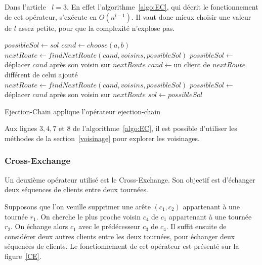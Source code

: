 \documentclass[a4paper,11pt]{article}%
\begin{document}
Dans l'article~\cite{Sorensen_2017} $l = 3$. En effet l'algorithme~\ref{algo:EC}, qui décrit le fonctionnement de cet opérateur, s'exécute en $O(n^{l-1})$. Il vaut donc mieux choisir une valeur de $l$ assez petite, pour que la complexité n'explose pas. 

\begin{algorithm}
\DontPrintSemicolon %
$possibleSol \gets sol$\;
$cand \gets choose(a,b)$\;
$nextRoute \gets findNextRoute(cand,voisins,possibleSol)$\;
$possibleSol \gets $ déplacer $cand$ après son voisin sur $nextRoute$\;
 {
  $cand \gets $un client de $nextRoute$ différent de celui ajouté\;
  $nextRoute \gets findNextRoute(cand,voisins,possibleSol)$\;
  $possibleSol \gets$ déplacer $cand$ après son voisin sur $nextRoute$\;
}
 {
	$sol \gets possibleSol$\;
}
\;
\caption{{\sc Ejection-Chain} applique l'opérateur ejection-chain}
\label{algo:EC}
\end{algorithm}

Aux lignes $3, 4, 7$ et $8$ de l'algorithme~\ref{algo:EC}, il est possible d'utiliser les méthodes de la section~\ref{voisinage} pour explorer les voisinages.

\subsubsection{Cross-Exchange}

Un deuxième opérateur utilisé est le Cross-Exchange.
Son objectif est d'échanger deux séquences de clients entre deux tournées.

Supposons que l'on veuille supprimer une arête $(c_1,c_2)$ appartenant à une tournée $r_1$. 
On cherche le plus proche voisin $c_4$ de $c_1$ appartenant à une tournée $r_2$.
On échange alors $c_1$ avec le prédécesseur $c_3$ de $c_4$.
Il suffit ensuite de considérer deux autres clients entre les deux tournées, pour  échanger deux séquences de clients.
Le fonctionnement de cet opérateur est présenté sur la figure~\ref{CE}.
\end{document}
